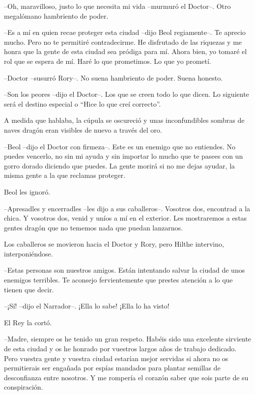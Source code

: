 {--Oh, maravilloso, justo lo que necesita mi vida --murmuró el
Doctor--. Otro megalómano hambriento de poder.}

{--Es a mí en quien recae proteger esta ciudad --dijo Beol
	regiamente--. Te aprecio mucho. Pero no te permitiré contradecirme. He
	disfrutado de las riquezas y me honra que la gente de esta ciudad sea
	pródiga para mí. Ahora bien, yo tomaré el rol que se espera de mí. Haré
lo que prometimos. Lo que yo prometí.}

{--Doctor --susurró Rory--. No suena hambriento de poder. Suena
honesto.}

{--Son los peores --dijo el Doctor--. Los que se creen todo lo que
	dicen. Lo siguiente será el destino especial o ``Hice lo que creí
correcto''.}

{A medida que hablaba, la cúpula se oscureció y unas inconfundibles
sombras de naves dragón eran visibles de nuevo a través del oro.}

{--Beol --dijo el Doctor con firmeza--. Este es un enemigo que no
	entiendes. No puedes vencerlo, no sin mi ayuda y sin importar lo mucho
	que te pasees con un gorro dorado diciendo que puedes. La gente morirá
si no me dejas ayudar, la misma gente a la que reclamas proteger.}

{Beol les ignoró.}

{--Apresadles y encerradles --les dijo a sus caballeros--. Vosotros
	dos, encontrad a la chica. Y vosotros dos, venid y uníos a mí en el
	exterior. Les mostraremos a estas gentes dragón que no tememos nada que
puedan lanzarnos.}

{Los caballeros se movieron hacia el Doctor y Rory, pero Hilthe
intervino, interponiéndose.}

{--Estas personas son nuestros amigos. Están intentando salvar la
	ciudad de unos enemigos terribles. Te aconsejo fervientemente que
prestes atención a lo que tienen que decir.}

{--¡Sí! --dijo el Narrador--. ¡Ella lo sabe! ¡Ella lo ha visto!}

{El Rey la cortó.}

{--Madre, siempre os he tenido un gran respeto. Habéis sido una
	excelente sirviente de esta ciudad y os he honrado por vuestros largos
	años de trabajo dedicado. Pero vuestra gente y vuestra ciudad estarían
	mejor servidas si ahora no os permitierais ser engañada por espías
	mandados para plantar semillas de desconfianza entre nosotros. Y me
rompería el corazón saber que sois parte de su conspiración.}

